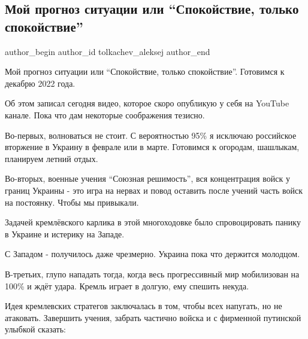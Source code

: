  
 
 
 
 
 
\subsection{Мой прогноз ситуации или \enquote{Спокойствие, только спокойствие}}
\label{sec:14_02_2022.fb.tolkachev_aleksej.1.spokojstvie_tolko_spokojstvie}
 
\ifcmt
 author_begin
   author_id tolkachev_aleksej
 author_end
\fi

Мой прогноз ситуации или \enquote{Спокойствие, только спокойствие}. Готовимся к декабрю
2022 года. 

Об этом записал сегодня видео, которое скоро опубликую у себя на YouTube
канале. Пока что дам некоторые соображения тезисно.  


Во-первых, волноваться не стоит. С вероятностью 95\% я исключаю российское
вторжение в Украину в феврале или в марте. Готовимся к огородам, шашлыкам,
планируем летний отдых. 

Во-вторых, военные учения \enquote{Союзная решимость}, вся концентрация войск у границ
Украины - это игра на нервах и повод  оставить после учений часть войск на
постоянку. Чтобы мы привыкали. 

Задачей кремлёвского карлика в этой многоходовке было спровоцировать панику в
Украине и истерику на Западе. 

С Западом - получилось даже чрезмерно. Украина пока что держится молодцом. 

В-третьих, глупо нападать тогда, когда весь прогрессивный мир мобилизован на
100\% и ждёт удара. Кремль играет в долгую, ему спешить некуда. 

Идея кремлевских стратегов заключалась в том, чтобы всех напугать, но не
атаковать. Завершить учения, забрать частично войска и с фирменной путинской
улыбкой сказать:

